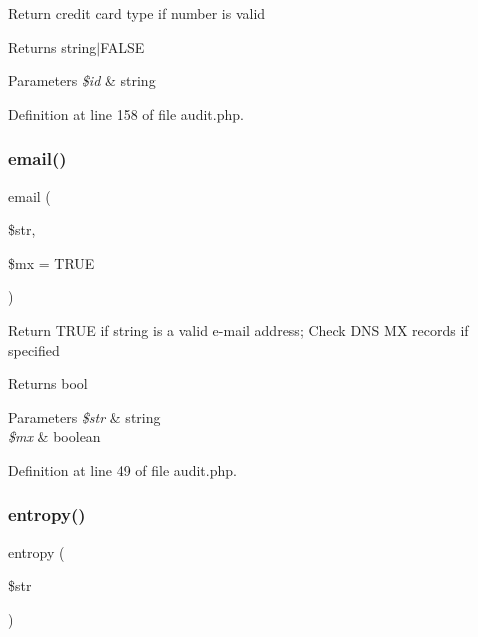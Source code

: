 Return credit card type if number is valid \begin{DoxyReturn}{Returns}
string$\vert$\+F\+A\+L\+SE 
\end{DoxyReturn}

\begin{DoxyParams}{Parameters}
{\em \$id} & string \\
\hline
\end{DoxyParams}


Definition at line 158 of file audit.\+php.

\hypertarget{class_audit_a369b2fd023996c185845f4993d03f530}{}\label{class_audit_a369b2fd023996c185845f4993d03f530} 
\subsubsection{\texorpdfstring{email()}{email()}}
{\footnotesize\ttfamily email (\begin{DoxyParamCaption}\item[{}]{\$str,  }\item[{}]{\$mx = {\ttfamily TRUE} }\end{DoxyParamCaption})}

Return T\+R\+UE if string is a valid e-\/mail address; Check D\+NS MX records if specified \begin{DoxyReturn}{Returns}
bool 
\end{DoxyReturn}

\begin{DoxyParams}{Parameters}
{\em \$str} & string \\
\hline
{\em \$mx} & boolean \\
\hline
\end{DoxyParams}


Definition at line 49 of file audit.\+php.

\hypertarget{class_audit_ac1c0abeb7a7ac6bf923e6e0abdfe336e}{}\label{class_audit_ac1c0abeb7a7ac6bf923e6e0abdfe336e} 
\subsubsection{\texorpdfstring{entropy()}{entropy()}}
{\footnotesize\ttfamily entropy (\begin{DoxyParamCaption}\item[{}]{\$str }\end{DoxyParamCaption})}

